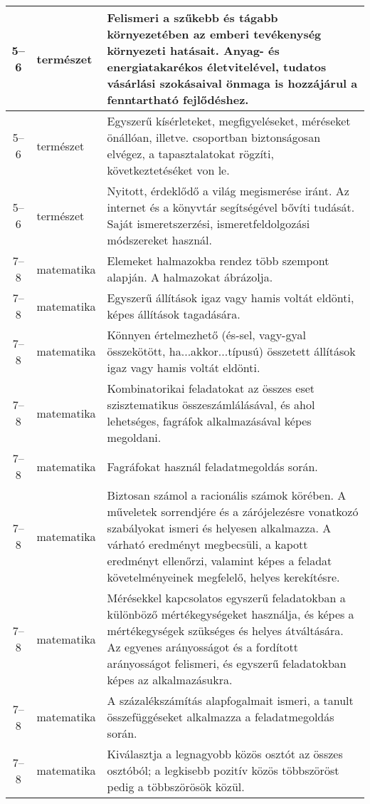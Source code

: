 \begin{small}
\begin{longtable}{c | p{2cm} |  p{11cm} }
              5--6 & természet & Felismeri a szűkebb és tágabb környezetében az emberi tevékenység környezeti hatásait. Anyag- és energiatakarékos életvitelével, tudatos vásárlási szokásaival önmaga is hozzájárul a fenntartható fejlődéshez. \\ \hline
              5--6 & természet & Egyszerű kísérleteket, megfigyeléseket, méréseket önállóan, illetve. csoportban biztonságosan elvégez, a tapasztalatokat rögzíti, következtetéséket von le. \\ \hline
              5--6 & természet & Nyitott, érdeklődő a világ megismerése iránt. Az internet és a könyvtár segítségével bővíti tudását. Saját ismeretszerzési, ismeretfeldolgozási módszereket használ. \\ \hline
              7--8 & matematika & Elemeket halmazokba rendez több szempont alapján. A halmazokat ábrázolja. \\ \hline
              7--8 & matematika & Egyszerű állítások igaz vagy hamis voltát eldönti, képes állítások tagadására. \\ \hline
              7--8 & matematika & Könnyen értelmezhető (és-sel, vagy-gyal összekötött, ha...akkor...típusú) összetett állítások igaz vagy hamis voltát eldönti. \\ \hline
              7--8 & matematika & Kombinatorikai feladatokat az összes eset szisztematikus összeszámlálásával, és ahol lehetséges, fagráfok alkalmazásával képes megoldani. \\ \hline
              7--8 & matematika & Fagráfokat használ feladatmegoldás során. \\ \hline
              7--8 & matematika & Biztosan számol a racionális számok körében. A műveletek sorrendjére és a zárójelezésre vonatkozó szabályokat ismeri és helyesen alkalmazza. A várható eredményt megbecsüli, a kapott  eredményt ellenőrzi, valamint képes a feladat követelményeinek megfelelő, helyes kerekítésre. \\ \hline
              7--8 & matematika & Mérésekkel kapcsolatos egyszerű feladatokban a különböző mértékegységeket használja, és képes a mértékegységek szükséges és helyes átváltására. Az egyenes arányosságot és a fordított arányosságot felismeri, és egyszerű feladatokban képes az alkalmazásukra.
 \\ \hline
              7--8 & matematika & A százalékszámítás alapfogalmait ismeri, a tanult összefüggéseket alkalmazza a  feladatmegoldás során. \\ \hline
              7--8 & matematika & Kiválasztja a legnagyobb közös osztót az összes osztóból; a legkisebb pozitív közös többszöröst pedig a többszörösök közül. \\ \hline

\end{longtable}
\end{small}
